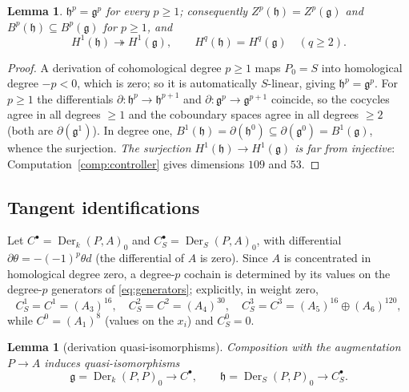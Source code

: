 \documentclass[11pt]{article}
\newtheorem{lemma}[theorem]{Lemma}
\theoremstyle{definition}
\theoremstyle{remark}
\newcommand{\Der}{\operatorname{Der}}
\newcommand{\g}{\mathfrak g}
\newcommand{\h}{\mathfrak h}
\begin{document}
\begin{lemma}\label{lem:relabs}
$\h^p=\g^p$ for every $p\geq1$; consequently
$Z^p(\h)=Z^p(\g)$ and $B^p(\h)\subseteq B^p(\g)$ for $p\ge 1$, and
\[
 H^1(\h)\twoheadrightarrow H^1(\g),
 \qquad
 H^q(\h)=H^q(\g)\quad(q\geq2).
\tag{2.3}\label{eq:relabscomp}
\]
\end{lemma}

\begin{proof}
A derivation of cohomological degree $p\geq1$ maps $P_0=S$ into homological
degree $-p<0$, which is zero; so it is automatically $S$-linear, giving
$\h^p=\g^p$.  For $p\geq1$ the differentials
$\partial:\h^p\to\h^{p+1}$ and $\partial:\g^p\to\g^{p+1}$ coincide, so the
cocycles agree in all degrees $\geq1$ and the coboundary spaces agree in all
degrees $\geq2$ (both are $\partial(\g^1)$).  In degree one,
$B^1(\h)=\partial(\h^0)\subseteq\partial(\g^0)=B^1(\g)$, whence the
surjection.  \emph{The surjection $H^1(\h)\to H^1(\g)$ is far from
injective}: Computation~\ref{comp:controller} gives dimensions $109$ and
$53$.
\end{proof}

\subsection{Tangent identifications}

Let $C^\bullet=\Der_k(P,A)_0$ and $C^\bullet_S=\Der_S(P,A)_0$, with
differential $\partial\theta=-(-1)^p\theta d$ (the differential of $A$ is
zero).  Since $A$ is concentrated in homological degree zero, a degree-$p$
cochain is determined by its values on the degree-$p$ generators of
\eqref{eq:generators}; explicitly, in weight zero,
\[
 C^1_S=C^1=(A_3)^{16},\quad
 C^2_S=C^2=(A_4)^{30},\quad
 C^3_S=C^3=(A_5)^{16}\oplus(A_6)^{120},
\tag{2.4}\label{eq:cochains}
\]
while $C^0=(A_1)^8$ (values on the $x_i$) and $C^0_S=0$.

\begin{lemma}[derivation quasi-isomorphisms]\label{lem:qiso}
Composition with the augmentation $P\to A$ induces quasi-isomorphisms
\[
 \g=\Der_k(P,P)_0\longrightarrow C^\bullet,
 \qquad
 \h=\Der_S(P,P)_0\longrightarrow C^\bullet_S .
\tag{2.5}\label{eq:qiso}
\]
\end{lemma}
\end{document}
